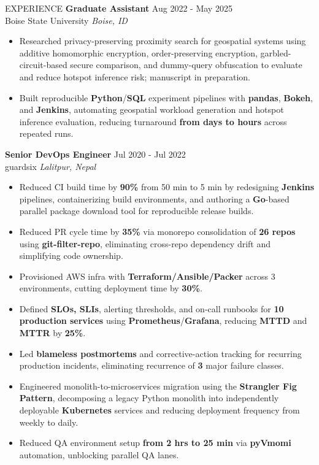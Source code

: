 \documentclass{resume} %
\begin{document}
\begin{rSection}{EXPERIENCE}
\textbf{Graduate Assistant} \hfill Aug 2022 - May 2025\\
Boise State University \hfill \textit{Boise, ID}
\vspace{-4pt}
\begin{itemize}
    \itemsep -3pt {}
    \item Researched privacy-preserving proximity search for geospatial systems using additive homomorphic encryption, order-preserving encryption, garbled-circuit-based secure comparison, and dummy-query obfuscation to evaluate and reduce hotspot inference risk; manuscript in preparation.
    \item Built reproducible \textbf{Python}/\textbf{SQL} experiment pipelines with \textbf{pandas}, \textbf{Bokeh}, and \textbf{Jenkins}, automating geospatial workload generation and hotspot inference evaluation, reducing turnaround \textbf{from days to hours} across repeated runs.
\end{itemize}

\textbf{Senior DevOps Engineer} \hfill Jul 2020 - Jul 2022\\
guardsix \hfill \textit{Lalitpur, Nepal}
\vspace{-4pt}
\begin{itemize}
    \itemsep -3pt {}
    \item Reduced CI build time by \textbf{90\%} from 50 min to 5 min by redesigning \textbf{Jenkins} pipelines, containerizing build environments, and authoring a \textbf{Go}-based parallel package download tool for reproducible release builds.
    \item Reduced PR cycle time by \textbf{35\%} via monorepo consolidation of \textbf{26 repos} using \textbf{git-filter-repo}, eliminating cross-repo dependency drift and simplifying code ownership.
    \item Provisioned AWS infra with \textbf{Terraform/Ansible/Packer} across 3 environments, cutting deployment time by \textbf{30\%}.
    \item Defined \textbf{SLOs, SLIs}, alerting thresholds, and on-call runbooks for \textbf{10 production services} using \textbf{Prometheus}/\textbf{Grafana}, reducing \textbf{MTTD} and \textbf{MTTR} by \textbf{25\%}.
    \item Led \textbf{blameless postmortems} and corrective-action tracking for recurring production incidents, eliminating recurrence of \textbf{3} major failure classes.
    \item Engineered monolith-to-microservices migration using the \textbf{Strangler Fig Pattern}, decomposing a legacy Python monolith into independently deployable \textbf{Kubernetes} services and reducing deployment frequency from weekly to daily.
    \item Reduced QA environment setup \textbf{from 2 hrs to 25 min} via \textbf{pyVmomi} automation, unblocking parallel QA lanes.
\end{itemize}


\end{rSection}
\end{document}
